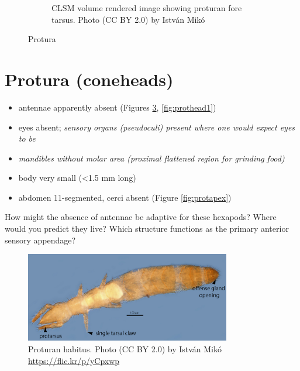 \documentclass[letterpaper, 11pt]{article}
\begin{document}
\begin{figure}[ht!]
\begin{subfigure}[ht!]{0.45\textwidth}
        \caption{CLSM volume rendered image showing proturan fore tarsus. Photo  (CC BY 2.0) by Istv\'an Mik\'o}
        \label{fig:prottars}
    \end{subfigure}
    \caption{Protura}\label{fig:proturans}
\end{figure}

\section{Protura (coneheads)}
\begin{itemize}
\item antennae apparently absent (Figures \ref{fig:proturanhab}, \ref{fig:prothead1})
\item eyes absent; \textit{sensory organs (pseudoculi) present where one would expect eyes to be}
\item \textit{mandibles without molar area (proximal flattened region for grinding food)}
\item body very small (\textless1.5 mm long)
\item abdomen 11-segmented, cerci absent (Figure \ref{fig:protapex})
\end{itemize}

\noindent{}How might the absence of antennae be adaptive for these hexapods? Where would you predict they live? Which structure functions as the primary anterior sensory appendage? \vspace{4cm} 

\begin{figure}[ht!]
  \centering
    \includegraphics[width=0.8\textwidth]{protVent}
  \caption{Proturan habitus. Photo (CC BY 2.0) by Istv\'an Mik\'o \url{https://flic.kr/p/yCpxwp}}
  \label{fig:proturanhab}
\end{figure}
\end{document}
